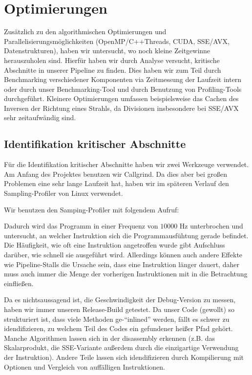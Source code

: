 \section{Optimierungen}
Zusätzlich zu den algorithmischen Optimierungen und Parallelisierungsmöglichkeiten (OpenMP/C++Threads, CUDA, SSE/AVX, Datenstrukturen), haben wir untersucht, wo noch kleine Zeitgewinne herauszuholen sind.
Hierfür haben wir durch Analyse versucht, kritische Abschnitte in unserer Pipeline zu finden.
Dies haben wir zum Teil durch Benchmarking verschiedener Komponenten via Zeitmessung der Laufzeit intern oder durch unser Benchmarking-Tool und durch Benutzung von Profiling-Tools durchgeführt.
Kleinere Optimierungen umfassen beispielsweise das Cachen des Inversen der Richtung eines Strahls, da Divisionen insbesondere bei SSE/AVX sehr zeitaufwändig sind.

\subsection{Identifikation kritischer Abschnitte}
\label{ssec:crit-section}

Für die Identifikation kritischer Abschnitte haben wir zwei Werkzeuge verwendet. Am Anfang des Projektes benutzen wir Callgrind. Da dies aber bei großen Problemen eine sehr lange Laufzeit hat, haben wir im späteren Verlauf den  Sampling-Profiler von Linux verwendet.

Wir benutzen den Samping-Profiler mit folgendem Aufruf:


Dadurch wird das Programm in einer Frequenz von $10000$ Hz unterbrochen und untersucht, an welcher Instruktion sich die Programmausfühtung gerade befindet. Die Häufigkeit, wie oft eine Instruktion angetroffen wurde gibt Aufschluss darüber, wie schnell sie ausgeführt wird. Allerdings können auch andere Effekte wie Pipeline-Stalls die Ursache sein, dass eine Instruktion länger dauert, daher muss auch immer die Menge der vorherigen Instruktionen mit in die Betrachtung einfließen.

Da es nichtsaussagend ist, die Geschwindigkeit der Debug-Version zu messen, haben wir immer unseren Release-Build getestet. Da unser Code (gewollt) so strukturiert ist, dass viele Methoden ge-"`inlined"' werden, fällt es schwer zu idendifizieren, zu welchem Teil des Codes ein gefundener heißer Pfad gehört. Manche Algorithmen lassen sich in der disassembly erkennen (z.B. das Skalarprodukt, die SSE-Variante außerdem durch die einzigartige Verwendung der  Instruktion). Andere Teile lassen sich idendifizieren durch Kompilierung mit  Optionen und Vergleich von auffälligen Instruktionen.

